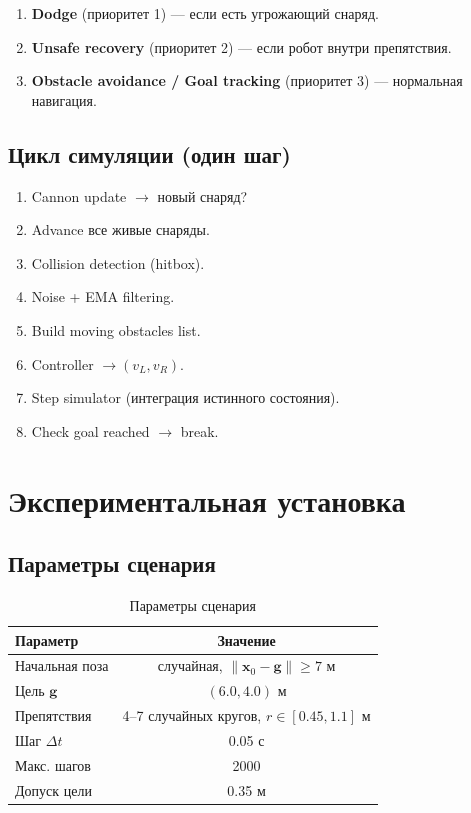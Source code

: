 \documentclass[12pt, a4paper]{article}
\theoremstyle{definition}
\theoremstyle{plain}
\begin{document}
\begin{enumerate}
  \item \textbf{Dodge} (приоритет 1) --- если есть угрожающий снаряд.
  \item \textbf{Unsafe recovery} (приоритет 2) --- если робот внутри препятствия.
  \item \textbf{Obstacle avoidance / Goal tracking} (приоритет 3) --- нормальная навигация.
\end{enumerate}

\subsection{Цикл симуляции (один шаг)}

\begin{enumerate}[nosep]
  \item Cannon update $\to$ новый снаряд?
  \item Advance все живые снаряды.
  \item Collision detection (hitbox).
  \item Noise + EMA filtering.
  \item Build moving obstacles list.
  \item Controller $\to (v_L, v_R)$.
  \item Step simulator (интеграция истинного состояния).
  \item Check goal reached $\to$ break.
\end{enumerate}

\section{Экспериментальная установка}\label{sec:setup}

\subsection{Параметры сценария}

\begin{table}[H]
\centering
\caption{Параметры сценария}
\begin{tabular}{@{}lc@{}}
\toprule
Параметр & Значение \\
\midrule
Начальная поза & случайная, $\|\mathbf{x}_0 - \mathbf{g}\| \ge 7$ м \\
Цель $\mathbf{g}$ & $(6.0, 4.0)$ м \\
Препятствия & 4--7 случайных кругов, $r \in [0.45, 1.1]$ м \\
Шаг $\Delta t$ & 0.05 с \\
Макс. шагов & 2000 \\
Допуск цели & 0.35 м \\
\bottomrule
\end{tabular}
\end{table}
\end{document}
